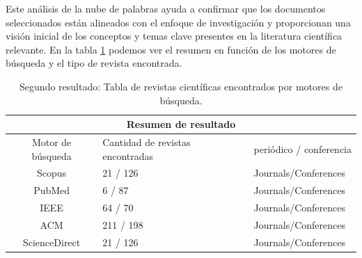 \documentclass[letterpaper]{article}
\begin{document}
Este análisis de la nube de palabras ayuda a confirmar que los documentos seleccionados están alineados con el enfoque de investigación y proporcionan una visión inicial de los conceptos y temas clave presentes en la literatura científica relevante.
En la tabla \ref{busqueda4} podemos ver el resumen en función de los motores de búsqueda y el tipo de revista encontrada.

\begin{table}[hbtp]
    \centering
    \caption{Resultados de búsquedas en diferentes bases de datos utilizando términos clave.}
    \label{busqueda3}
\end{table}

\begin{table}[hbtp]
    		\centering
    		\begin{tabular}{@{}cll@{}} \toprule
    			\multicolumn{3}{c}{\textbf{Resumen de resultado}} \\ \midrule
    			Motor de búsqueda & Cantidad de revistas encontradas & periódico / conferencia \\ \midrule
                Scopus & 21 / 126 & Journals/Conferences \\
    			PubMed & 6 / 87 & Journals/Conferences \\
    			IEEE & 64 / 70 & Journals/Conferences \\
    			ACM & 211 / 198 & Journals/Conferences \\
    			ScienceDirect & 21 / 126 & Journals/Conferences \\ \bottomrule
    		\end{tabular}
    		\caption{Segundo resultado: Tabla de revistas científicas encontrados por motores de búsqueda.}
    		\label{busqueda4}
    	\end{table}
\end{document}
